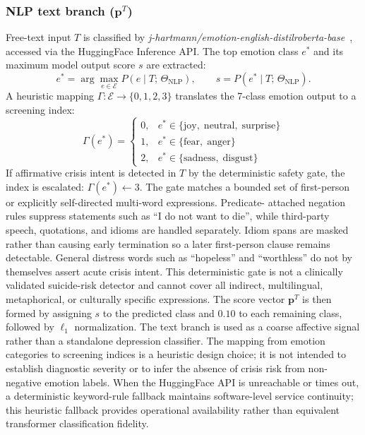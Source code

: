 \documentclass[10pt, conference, letterpaper]{IEEEtran}
\begin{document}
\subsubsection{NLP text branch ($\mathbf{p}^T$)}
Free-text input $T$ is classified by \textit{j-hartmann/emotion-english-distilroberta-base}~\cite{hartmann2022},
accessed via the HuggingFace Inference API.
The top emotion class $e^*$ and its maximum model output score $s$ are extracted:
\begin{equation}
  e^* = \arg\max_{e \in \mathcal{E}} P(e \mid T;\,\Theta_{\text{NLP}}),
  \qquad
  s = P(e^* \mid T;\,\Theta_{\text{NLP}}).
  \label{eq:nlp_argmax}
\end{equation}
A heuristic mapping $\Gamma: \mathcal{E} \to \{0,1,2,3\}$ translates the
7-class emotion output to a screening index:
\begin{equation}
  \Gamma(e^*) =
  \begin{cases}
    0, & e^* \in \{\text{joy},\;\text{neutral},\;\text{surprise}\} \\
    1, & e^* \in \{\text{fear},\;\text{anger}\} \\
    2, & e^* \in \{\text{sadness},\;\text{disgust}\}
  \end{cases}
  \label{eq:emotion_map}
\end{equation}
If affirmative crisis intent is detected in $T$ by the deterministic safety gate,
the index is escalated: $\Gamma(e^*) \leftarrow 3$. The gate matches a bounded
set of first-person or explicitly self-directed multi-word expressions. Predicate-
attached negation rules suppress statements such as ``I do not want to die'',
while third-party speech, quotations, and idioms are handled separately. Idiom
spans are masked rather than causing early termination so a later first-person
clause remains detectable. General distress words such as ``hopeless'' and
``worthless'' do not by themselves assert acute crisis intent. This deterministic
gate is not a clinically validated suicide-risk detector and cannot cover all
indirect, multilingual, metaphorical, or culturally specific expressions.
The score vector $\mathbf{p}^T$ is then formed by assigning $s$ to the
predicted class and $0.10$ to each remaining class, followed by
$\ell_1$ normalization.
The text branch is used as a coarse affective signal rather than a standalone
depression classifier. The mapping from emotion categories to screening indices
is a heuristic design choice; it is not intended to establish diagnostic severity
or to infer the absence of crisis risk from non-negative emotion labels.
When the HuggingFace API is unreachable or times out, a deterministic keyword-rule
fallback maintains software-level service continuity; this heuristic fallback
provides operational availability rather than equivalent transformer classification fidelity.
\end{document}
